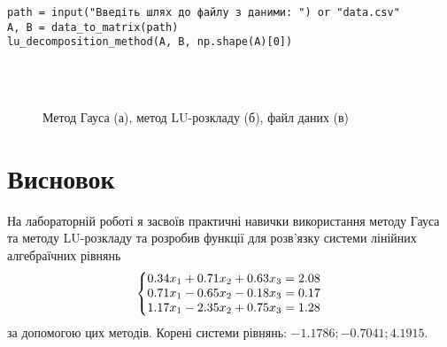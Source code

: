 \documentclass{article}
\begin{document}
\begin{large}
\begin{lstlisting}
path = input("Введіть шлях до файлу з даними: ") or "data.csv"
A, B = data_to_matrix(path)
lu_decomposition_method(A, B, np.shape(A)[0])\end{lstlisting}
		
		\begin{figure}[h!]
			\centering
			\subfigure[]{\texttt{[image: 1]}}\\
			\subfigure[]{\texttt{[image: 2]}}\\
			\subfigure[]{\texttt{[image: 3]}}
			\caption{Метод Гауса (а), метод LU-розкладу (б), файл даних (в)}
		\end{figure}
		
		\section*{Висновок}
		На лабораторній роботі я засвоїв практичні навички використання методу Гауса та методу LU-розкладу та розробив функції для розв’язку системи лінійних алгебраїчних рівнянь 
		\begin{gather}\nonumber
			\left\{\begin{array}{@{}l@{}}
				0.34x_1 + 0.71x_2 + 0.63x_3 = 2.08\\\nonumber
				0.71x_1 - 0.65x_2 - 0.18x_3 = 0.17\\\nonumber
				1.17x_1 - 2.35x_2 + 0.75x_3 = 1.28\nonumber
			\end{array}\right.\,
		\end{gather}
		за допомогою цих методів. Корені системи рівнянь: $-1.1786; -0.7041; 4.1915$.
		
	\end{large}
\end{document}
